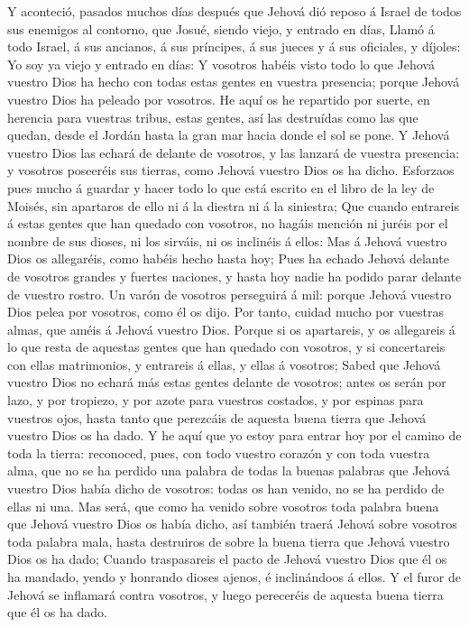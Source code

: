  Y aconteció, pasados muchos días después que Jehová dió
reposo á Israel de todos sus enemigos al contorno, que Josué, siendo
viejo, y entrado en días,  Llamó á todo Israel, á sus
ancianos, á sus príncipes, á sus jueces y á sus oficiales, y díjoles: Yo
soy ya viejo y entrado en días:  Y vosotros habéis visto
todo lo que Jehová vuestro Dios ha hecho con todas estas gentes en
vuestra presencia; porque Jehová vuestro Dios ha peleado por vosotros.
 He aquí os he repartido por suerte, en herencia para
vuestras tribus, estas gentes, así las destruídas como las que quedan,
desde el Jordán hasta la gran mar hacia donde el sol se pone.
 Y Jehová vuestro Dios las echará de delante de vosotros, y
las lanzará de vuestra presencia: y vosotros poseeréis sus tierras, como
Jehová vuestro Dios os ha dicho.  Esforzaos pues mucho á
guardar y hacer todo lo que está escrito en el libro de la ley de
Moisés, sin apartaros de ello ni á la diestra ni á la siniestra;
 Que cuando entrareis á estas gentes que han quedado con
vosotros, no hagáis mención ni juréis por el nombre de sus dioses, ni
los sirváis, ni os inclinéis á ellos:  Mas á Jehová vuestro
Dios os allegaréis, como habéis hecho hasta hoy;  Pues ha
echado Jehová delante de vosotros grandes y fuertes naciones, y hasta
hoy nadie ha podido parar delante de vuestro rostro.  Un
varón de vosotros perseguirá á mil: porque Jehová vuestro Dios pelea por
vosotros, como él os dijo.  Por tanto, cuidad mucho por
vuestras almas, que améis á Jehová vuestro Dios.  Porque si
os apartareis, y os allegareis á lo que resta de aquestas gentes que han
quedado con vosotros, y si concertareis con ellas matrimonios, y
entrareis á ellas, y ellas á vosotros;  Sabed que Jehová
vuestro Dios no echará más estas gentes delante de vosotros; antes os
serán por lazo, y por tropiezo, y por azote para vuestros costados, y
por espinas para vuestros ojos, hasta tanto que perezcáis de aquesta
buena tierra que Jehová vuestro Dios os ha dado.  Y he aquí
que yo estoy para entrar hoy por el camino de toda la tierra: reconoced,
pues, con todo vuestro corazón y con toda vuestra alma, que no se ha
perdido una palabra de todas la buenas palabras que Jehová vuestro Dios
había dicho de vosotros: todas os han venido, no se ha perdido de ellas
ni una.  Mas será, que como ha venido sobre vosotros toda
palabra buena que Jehová vuestro Dios os había dicho, así también traerá
Jehová sobre vosotros toda palabra mala, hasta destruiros de sobre la
buena tierra que Jehová vuestro Dios os ha dado;  Cuando
traspasareis el pacto de Jehová vuestro Dios que él os ha mandado, yendo
y honrando dioses ajenos, é inclinándoos á ellos. Y el furor de Jehová
se inflamará contra vosotros, y luego pereceréis de aquesta buena tierra
que él os ha dado.

